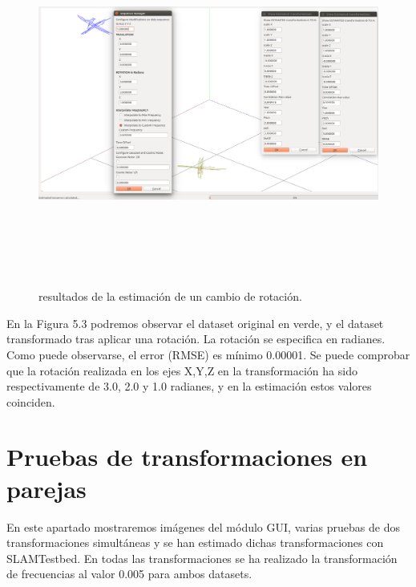 \begin{figure}[h]
\label{fig:rotationTest}\includegraphics[height=12.0cm,width=18.0cm]{img/cap6/Rotation_ab_ba.png}
\hspace{0.5cm}


\caption{resultados de la estimación de un cambio de rotación.}
\end{figure}

En la Figura 5.3 podremos observar el dataset original en verde, y el dataset transformado tras aplicar una rotación. La rotación se especifica en radianes. Como puede observarse, el error (RMSE) es mínimo 0.00001. Se puede comprobar que la rotación realizada en los ejes X,Y,Z en la transformación ha sido respectivamente de 3.0, 2.0 y 1.0 radianes, y en la estimación estos valores coinciden.


\section{Pruebas de transformaciones en parejas}
En este apartado mostraremos imágenes del módulo GUI, varias pruebas de dos  transformaciones simultáneas y se han estimado dichas transformaciones con SLAMTestbed.
En todas las transformaciones se ha realizado la transformación de frecuencias al valor 0.005 para ambos datasets. 

